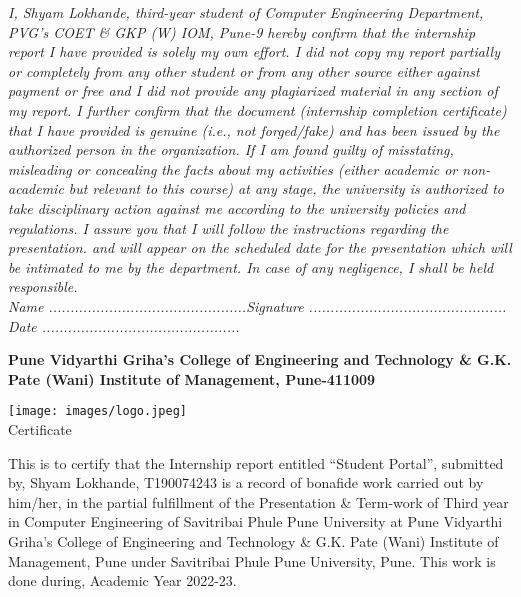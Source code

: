 \documentclass[12pt]{article}
\begin{document}
\emph{I, Shyam Lokhande, third-year student of Computer Engineering Department, PVG’s COET \& GKP
(W) IOM, Pune-9 hereby confirm that the internship report I have provided is solely my own
effort. I did not copy my report partially or completely from any other student or from any other
source either against payment or free and I did not provide any plagiarized material in any
section of my report. I further confirm that the document (internship completion certificate)
that I have provided is genuine (i.e., not forged/fake) and has been issued by the authorized
person in the organization. If I am found guilty of misstating, misleading or concealing the facts
about my activities (either academic or non-academic but relevant to this course) at any stage,
the university is authorized to take disciplinary action against me according to the university
policies and regulations. I assure you that I will follow the instructions regarding the presentation. and
will appear on the scheduled date for the presentation which will be intimated to me by the
department. In case of any negligence, I shall be held responsible.}\\
\vspace{1.5cm}
\emph{Name ..............................................\hspace{1cm}Signature ..............................................}\\
\bigskip
\emph{Date ..............................................}
\pagebreak
\begin{center}
{\fontsize{21}{20}\selectfont \textbf{Pune Vidyarthi Griha's College of Engineering and Technology \& G.K. Pate (Wani) Institute of Management, Pune-411009}}


\vspace{0.5cm}


\noindent \texttt{[image: images/logo.jpeg]}\\
\medskip
{\Large{Certificate}}\\
\end{center}
\medskip
This is to certify that the Internship report entitled “Student Portal”, submitted by, 
Shyam Lokhande, T190074243 is a record of bonafide work carried out by him/her, in the partial fulfillment of the Presentation \& Term-work of Third year in Computer Engineering of Savitribai Phule Pune University at Pune Vidyarthi Griha’s College of Engineering and Technology \& G.K. Pate (Wani) Institute of Management, Pune under Savitribai Phule Pune University, Pune. This work is done during, Academic Year 2022-23.
\end{document}
